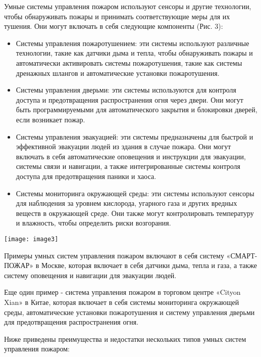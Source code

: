 \begin{multicols}{2}
Умные системы управления пожаром используют сенсоры и другие технологии,
чтобы обнаруживать пожары и принимать соответствующие меры для их
тушения. Они могут включать в себя следующие компоненты (Рис. 3):

\begin{itemize}
\item
  Системы управления пожаротушением: эти системы используют различные
  технологии, такие как датчики дыма и тепла, чтобы обнаруживать пожары
  и автоматически активировать системы пожаротушения, такие как системы
  дренажных шлангов и автоматические установки пожаротушения.
\item
  Системы управления дверьми: эти системы используются для контроля
  доступа и предотвращения распространения огня через двери. Они могут
  быть программируемыми для автоматического закрытия и блокировки
  дверей, если возникает пожар.
\item
  Системы управления эвакуацией: эти системы предназначены для быстрой и
  эффективной эвакуации людей из здания в случае пожара. Они могут
  включать в себя автоматические оповещения и инструкции для эвакуации,
  системы связи и навигации, а также интегрированные системы контроля
  доступа для предотвращения паники и хаоса.
\item
  Системы мониторинга окружающей среды: эти системы используют сенсоры
  для наблюдения за уровнем кислорода, угарного газа и других вредных
  веществ в окружающей среде. Они также могут контролировать температуру
  и влажность, чтобы определить риски возгорания.
\end{itemize}

\begin{center}
  \texttt{[image: image3]}
\end{center}

Примеры умных систем управления пожаром включают в себя систему
«СМАРТ-ПОЖАР» в Москве, которая включает в себя датчики дыма, тепла и
газа, а также систему оповещения и навигации для эвакуации людей.

Еще один пример - система управления пожаром в торговом центре «Cityon
Xi\textquotesingle an» в Китае, которая включает в себя системы
мониторинга окружающей среды, автоматические установки пожаротушения и
систему управления дверьми для предотвращения распространения огня.

Ниже приведены преимущества и недостатки нескольких типов умных систем
управления пожаром:


\end{multicols}
